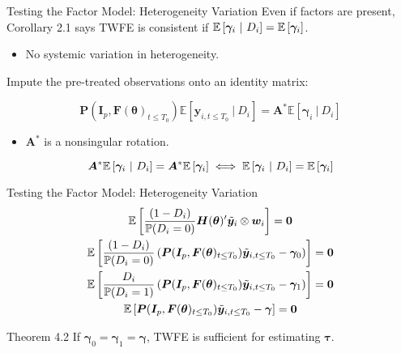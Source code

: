 \documentclass{beamer}
\newcommand{\1}{\mathds{1}} %
\newcommand{\condexpec}[2]{\mathbb{E}\left[#1 \ \vert \ #2\right]}
\begin{document}

\begin{frame}{Testing the Factor Model: Heterogeneity Variation}
    Even if factors are present, Corollary 2.1 says TWFE is consistent if $\condexpec{\bm \gamma_i}{D_i} = \expec{\bm \gamma_i}$.

    \vspace{.25 cm}
    
    \begin{itemize}
        \item No systemic variation in heterogeneity.
    \end{itemize}

    \vspace{.5 cm}

    Impute the pre-treated observations onto an identity matrix:

    \begin{equation*}
        \bm P(\bm I_{p}, \bm F(\bm \theta)_{t \leq T_0}) \condexpec{\bm y_{i, t \leq T_0}}{D_i} = \bm A^* \condexpec{\bm \gamma_i}{D_i} 
    \end{equation*}
    \begin{itemize}
        \item $\bm A^*$ is a nonsingular rotation.
    \end{itemize}

    \begin{equation*}
        \bm A^* \condexpec{\bm \gamma_i}{D_i} = \bm A^* \expec{\bm \gamma_i} \iff \condexpec{\bm \gamma_i}{D_i } = \expec{\bm \gamma_i}
    \end{equation*}
\end{frame}


\begin{frame}{Testing the Factor Model: Heterogeneity Variation}
    \begin{gather*}
        \mathbb{E}\left[\frac{(1 - D_i)}{\mathbb{P}(D_i = 0)} \bm H(\bm \theta)' \tilde{\bm y}_i \otimes \bm w_i\right] = \bm 0\\
        \mathbb{E}\left[\frac{(1 - D_i)}{\mathbb{P}(D_i = 0)} \left( \bm P(\bm I_{p}, \bm F(\bm \theta)_{t \leq T_0}) \tilde{\bm y}_{i, t \leq T_0} - \bm \gamma_0 \right) \right] = \bm 0\\
        \mathbb{E}\left[\frac{D_i}{\mathbb{P}(D_i = 1)} \left( \bm P(\bm I_{p}, \bm F(\bm \theta)_{t \leq T_0}) \tilde{\bm y}_{i, t \leq T_0} - \bm \gamma_1 \right) \right] = \bm 0\\
        \mathbb{E}\left[\bm P(\bm I_{p}, \bm F(\bm \theta)_{t \leq T_0}) \tilde{\bm y}_{i, t \leq T_0} - \bm \gamma\right] = \bm 0
    \end{gather*}

    \begin{block}{Theorem 4.2}
        If $\bm \gamma_0 = \bm \gamma_1 = \bm \gamma$, TWFE is sufficient for estimating $\bm \tau$.
    \end{block}
\end{frame}
\end{document}
